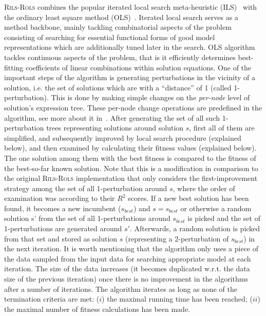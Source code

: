\documentclass{bmcart}
\begin{document}
 \textsc{Rils}-\textsc{Rols} combines the popular iterated local search meta-heuristic (ILS)~\cite{lourencco2003iterated,lourencco2010iterated} with the ordinary least square method (OLS)~\cite{leng2007ordinary}.  Iterated local search serves as a method backbone,  mainly tackling combinatorial aspects of the problem consisting of searching for essential functional forms of good model representations which are additionally tuned later in the search. OLS algorithm tackles continuous aspects of the problem, that is it efficiently determines best-fitting coefficients of  linear  combinations within solution equations. One of the  important steps of the algorithm is generating perturbations in the vicinity of a solution, i.e. the set of solutions  which are with a ``distance'' of 1 (called 1-perturbation). This is done by making simple changes on the \emph{per-node} level of solution's expression tree.  These per-node change operations are predefined in the algorithm, see more about it in~\cite{kartelj2023rils}. After generating the set of all such 1-perturbation trees representing solutions around solution $s$, first all of them are  simplified, and subsequently improved by local search procedure (explained below),  and then examined by calculating their fitness values (explained below). The one solution among them with the best fitness is compared to the fitness of the best-so-far known solution. Note that this is a modification in comparison to the original \textsc{Rils}-\textsc{Rols} implementation that only considers the first-improvement strategy among the set of all 1-perturbation around $s$, where the order of examination was according to their $R^2$ scores. If a new best solution has been found, it becomes a new incumbent ($s_{best}$) and $s=s_{best}$ or otherwise a random solution s' from the set of all 1-perturbations around $s_{best}$ is picked and the set of 1-perturbations are generated around $s'$. Afterwards, a random solution is picked from that set and stored as solution $s$ (representing a 2-perturbation of $s_{best}$) in the next iteration. It is worth mentioning that the algorithm only uses a piece of the data sampled from the input data for searching appropriate model  at each iteration. The size of the data increases (it becomes duplicated w.r.t. the data size of the previous iteration) once there is no improvement in the algorithms after a number of iterations. The algorithm iterates as long as none of the termination criteria are met: ($i$) the maximal running time has been reached; ($ii$) the maximal number of fitness calculations has been made.
  
\end{document}

